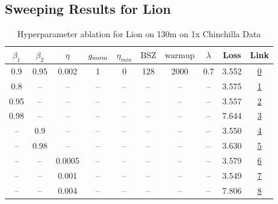 \subsection{Sweeping Results for Lion}%
\begin{table}[H]
\centering
\caption{Hyperparameter ablation for Lion on 130m on 1x Chinchilla Data}
\label{tab:ablation_lion_130m_on_1x_chinchilla_data}
\begin{tabular}{cccccccccc}
\toprule
$\beta_1$ & $\beta_2$ & $\eta$ & $g_{\mathrm{norm}}$ & $\eta_{min}$ & $\mathrm{BSZ}$ & $\mathrm{warmup}$ & $\lambda$ & Loss & Link \\
\midrule
0.9 & 0.95 & 0.002 & 1 & 0 & 128 & 2000 & 0.7 & 3.552 & \href{https://wandb.ai/marin-community/optimizer-scaling/runs/sweep-130m-2B-lion3532d0lr0.002-wd0.7-minlr0-warmup2000-b10.9-b2-2f88e4}{0} \\
\midrule
0.8 & -- & -- & -- & -- & -- & -- & -- & 3.575 & \href{https://wandb.ai/marin-community/optimizer-scaling/runs/sweep-130m-2B-lion8b138flr0.002-wd0.7-minlr0-warmup2000-b10.8-b2-9d739e}{1} \\
0.95 & -- & -- & -- & -- & -- & -- & -- & 3.557 & \href{https://wandb.ai/marin-community/optimizer-scaling/runs/sweep-130m-2B-lion49977alr0.002-wd0.7-minlr0-warmup2000-b10.95-b-0c8700}{2} \\
0.98 & -- & -- & -- & -- & -- & -- & -- & 7.644 & \href{https://wandb.ai/marin-community/optimizer-scaling/runs/sweep-130m-2B-lion584608lr0.002-wd0.7-minlr0-warmup2000-b10.98-b-bb0378}{3} \\
-- & 0.9 & -- & -- & -- & -- & -- & -- & 3.550 & \href{https://wandb.ai/marin-community/optimizer-scaling/runs/sweep-130m-2B-lionf88c83lr0.002-wd0.7-minlr0-warmup2000-b10.9-b2-3f2e17}{4} \\
-- & 0.98 & -- & -- & -- & -- & -- & -- & 3.630 & \href{https://wandb.ai/marin-community/optimizer-scaling/runs/sweep-130m-2B-lionfc7ef4lr0.002-wd0.7-minlr0-warmup2000-b10.9-b2-27db87}{5} \\
-- & -- & 0.0005 & -- & -- & -- & -- & -- & 3.579 & \href{https://wandb.ai/marin-community/optimizer-scaling/runs/sweep-130m-2B-liony630ce4lr0.0005-wd0.7-minlr0-warmup2000-b10.9--ceaedd}{6} \\
-- & -- & 0.001 & -- & -- & -- & -- & -- & 3.549 & \href{https://wandb.ai/marin-community/optimizer-scaling/runs/sweep-130m-2B-lion5039d1lr0.001-wd0.7-minlr0-warmup2000-b10.9-b2-3938db}{7} \\
-- & -- & 0.004 & -- & -- & -- & -- & -- & 7.806 & \href{https://wandb.ai/marin-community/optimizer-scaling/runs/sweep-130m-2B-liona51523lr0.004-wd0.7-minlr0-warmup2000-b10.9-b2-7563ab}{8} \\

\end{tabular}
\end{table}
